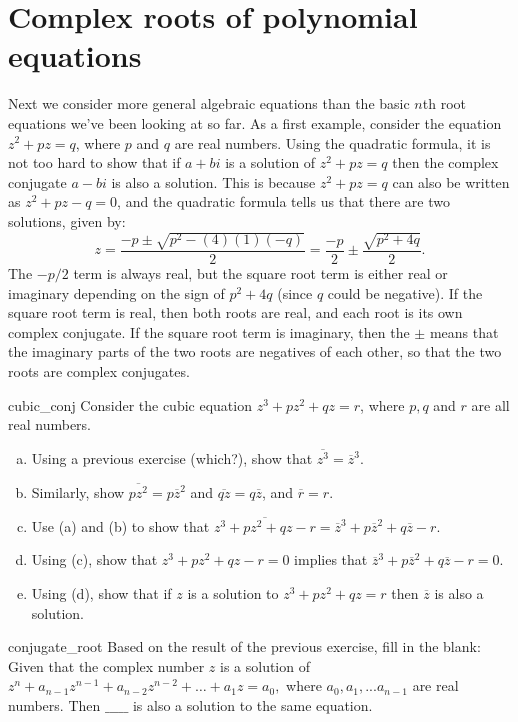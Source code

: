 {\section{Complex roots of polynomial equations}\label{sec:FTOA}

Next we consider more general algebraic equations than the basic $n$th root equations we've been looking at so far. As a first example, consider the equation $z^2 + pz = q$, where $p$ and  $q$ are real numbers. Using  the quadratic formula, it is not too hard to show that if $a + bi$ is a solution of $z^2 + pz = q$ then the complex conjugate $a - bi$ is also a solution. This is because  $z^2 + pz = q$ can also be written as  $z^2 + pz - q = 0$, and the quadratic formula tells us that there are two solutions, given by:
$$ z = \frac{-p \pm \sqrt{p^2 - (4)(1)(-q)}}{2} = \frac{-p}{2}  \pm \frac{\sqrt{p^2 + 4q}}{2}.$$
The $-p/2$ term is always real, but the square root term is either real or imaginary depending on the sign of $p^2 + 4q$  (since $q$ could be negative).  If the square root term is real, then both roots are real, and each root is its own complex conjugate.  If the square root term is imaginary, then the $\pm$ means that the imaginary parts of the two roots are negatives of each other, so that the two roots are complex conjugates.

\begin{exercise}{cubic_conj}
Consider the cubic equation $z^3 + pz^2 + qz = r$, where $p, q$ and  $r$ are all real numbers.
\begin{enumerate}[(a)]
\item
Using a previous exercise (which?), show that $\overline{z^3} = \overline{z}^3$.
\item
Similarly, show  $\overline{pz^2} = p\overline{z}^2$ and $\overline{qz} = q\overline{z}$, and $\overline{r} = r$.
\item 
Use (a) and (b) to show that $\overline{z^3 + pz^2 + qz - r} = \overline{z}^3 + p\overline{z}^2 + q\overline{z} - r$.
\item
Using (c), show that $z^3 + pz^2 + qz - r = 0$ implies that $\overline{z}^3 + p\overline{z}^2 + q\overline{z} - r = 0$.
\item
Using (d), show that if $z$ is a solution to $z^3 + pz^2 + qz = r$ then $\overline{z}$ is also a solution.
\end{enumerate}
\end{exercise}

\begin{exercise}{conjugate_root}
Based on the result of the previous exercise, fill in the blank: Given that the complex number $z$ is a solution of $z^n + a_{n-1}z^{n-1} + a_{n-2} z^{n-2} + \ldots + a_1 z =a_0,$ where $a_0, a_1, ... a_{n-1}$ are real numbers. Then $\_\_\_\_\_$ is also a solution to the same equation.
\end{exercise}

}
